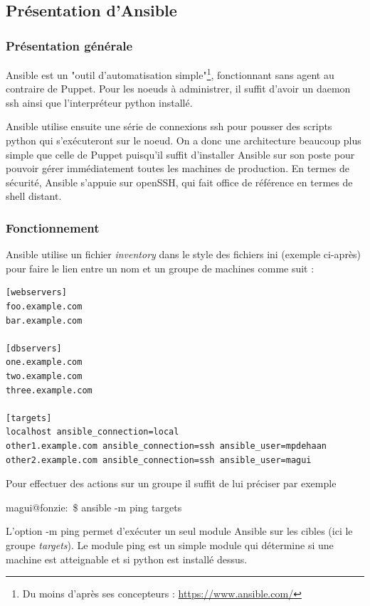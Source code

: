 \documentclass[14 pt]{extreport}
\begin{document}
\subsection{Présentation d'Ansible}

\subsubsection{Présentation générale}
Ansible est un "outil d'automatisation simple"\footnote{Du moins d'après ses concepteurs : \url{https://www.ansible.com/}}, fonctionnant sans agent au contraire de Puppet. Pour les noeuds à administrer, il suffit d'avoir un daemon ssh ainsi que l'interpréteur python installé. 

Ansible utilise ensuite une série de connexions ssh pour pousser des scripts python qui s'exécuteront sur le noeud. On a donc une architecture beaucoup plus simple que celle de Puppet puisqu'il suffit d'installer Ansible sur son poste pour pouvoir gérer immédiatement toutes les machines de production. En termes de sécurité, Ansible s'appuie sur openSSH, qui fait office de référence en termes de shell distant.

\subsubsection{Fonctionnement}

Ansible utilise un fichier \emph{inventory} dans le style des fichiers ini (exemple ci-après) pour faire le lien entre un nom et un groupe de machines comme suit :
\newpage
\begin{framed}
\begin{Verbatim}[fontsize=\scriptsize]
[webservers]
foo.example.com
bar.example.com

[dbservers]
one.example.com
two.example.com
three.example.com

[targets]
localhost ansible_connection=local
other1.example.com ansible_connection=ssh ansible_user=mpdehaan
other2.example.com ansible_connection=ssh ansible_user=magui
\end{Verbatim}
\end{framed}
Pour effectuer des actions sur un groupe il suffit de lui préciser par exemple \begin{framed}magui@fonzie:~\$ ansible -m ping targets\end{framed}

L'option -m ping permet d'exécuter un seul module Ansible sur les cibles (ici le groupe \emph{targets}). Le module ping est un simple module qui détermine si une machine est atteignable et si python est installé dessus.
\end{document}
